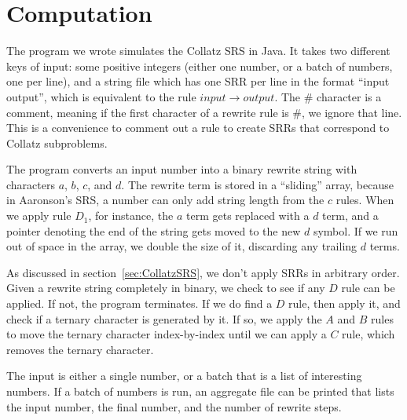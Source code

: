 \section{Computation} \label{subsec:rewritecomp}
The program we wrote simulates the Collatz SRS in Java. It takes two different keys of input: some positive integers (either one number, or a batch of numbers, one per line), and a string file which has one SRR per line in the format ``input output'', which is equivalent to the rule $input \rightarrow output$. The \# character is a comment, meaning if the first character of a rewrite rule is \#, we ignore that line. This is a convenience to comment out a rule to create SRRs that correspond to Collatz subproblems. \par
The program converts an input number into a binary rewrite string with characters $a$, $b$, $c$, and $d$. The rewrite term is stored in a ``sliding'' array, because in Aaronson's SRS, a number can only add string length from the $c$ rules. When we apply rule $D_1$, for instance, the $a$ term gets replaced with a $d$ term, and a pointer denoting the end of the string gets moved to the new $d$ symbol. If we run out of space in the array, we double the size of it, discarding any trailing $d$ terms. \par
As discussed in section~\ref{sec:CollatzSRS}, we don't apply SRRs in arbitrary order. Given a rewrite string completely in binary, we check to see if any $D$ rule can be applied. If not, the program terminates. If we do find a $D$ rule, then apply it, and check if a ternary character is generated by it. If so, we apply the $A$ and $B$ rules to move the ternary character index-by-index until we can apply a $C$ rule, which removes the ternary character. \par
The input is either a single number, or a batch that is a list of interesting numbers. If a batch of numbers is run, an aggregate file can be printed that lists the input number, the final number, and the number of rewrite steps.

